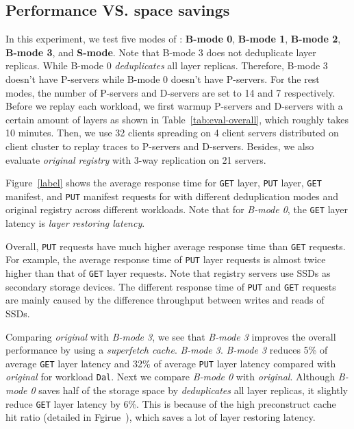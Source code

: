 

\subsection{Performance VS. space savings}
\label{sec:eval-dedup}


In this experiment,
we test five modes of \sysname:
\textbf{B-mode 0},
\textbf{B-mode 1},
\textbf{B-mode 2},
\textbf{B-mode 3}, and
\textbf{S-mode}.
Note that B-mode 3 does not deduplicate layer replicas.
While B-mode 0 \emph{deduplicates} all layer replicas. 
Therefore, B-mode 3 doesn't have P-servers while
B-mode 0 doesn't have P-servers.
For the rest modes,
the number of P-servers and D-servers are set to 14 and 7 respectively.
Before we replay each workload,
we first warmup P-servers and D-servers with a certain amount of layers as shown in Table~\ref{tab:eval-overall},
which roughly takes 10 minutes.
Then,
we use 32 clients spreading on 4 client servers 
distributed on client cluster to replay traces to P-servers and D-servers.
Besides,
we also evaluate \emph{original registry} with 3-way replication on 21 servers. 

Figure~\ref{label} shows the average response time for 
\texttt{GET} layer, \texttt{PUT} layer, \texttt{GET} manifest, and \texttt{PUT} manifest
requests for \sysname with different deduplication modes and original registry across different workloads.
Note that for \emph{B-mode 0},
the \texttt{GET} layer latency is \emph{layer restoring latency}.

Overall, \texttt{PUT} requests have much higher average response time than \texttt{GET} requests.
For example, the average response time of 
\texttt{PUT} layer requests is almost twice higher than that of \texttt{GET} layer requests.
Note that registry servers use SSDs as secondary storage devices.
The different response time of \texttt{PUT} and \texttt{GET} requests are mainly caused by
the difference throughput between writes and reads of SSDs. 

Comparing \emph{original} with \emph{B-mode 3},
we see that \emph{B-mode 3} improves the overall performance by using a \emph{superfetch cache}.
\emph{B-mode 3}.
\emph{B-mode 3} reduces 5\% of average \texttt{GET} layer latency
and 32\% of average \texttt{PUT} layer latency compared with \emph{original} for workload \texttt{Dal}.
Next we compare \emph{B-mode 0} with \emph{original}.
Although \emph{B-mode 0} saves half of the storage space
by \emph{deduplicates} all layer replicas,
it slightly reduce \texttt{GET} layer latency by 6\%.
This is because of the high preconstruct cache hit ratio (detailed in Fgirue~\cite{xxx}), 
which saves a lot of layer restoring latency.


